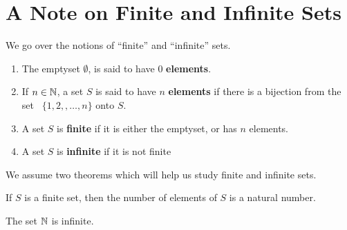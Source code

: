 
\section{A Note on Finite and Infinite Sets}

We go over the notions of ``finite'' and ``infinite'' sets.

\begin{definition}
    \begin{enumerate}[label=(\arabic*)]
        \item The emptyset $\emptyset$, is said to have $0$ \textbf{elements}.

        \item If $n \in \mathbb{N}$, a set  $S$ is said to have $n$ \textbf{elements} if there is a bijection from the set \
            $\{1,2,,\dots, n\}$ onto  $S$.

        \item A set  $S$ is \textbf{finite} if it is either the emptyset, or has $n$ elements.

        \item A set $S$ is \textbf{infinite} if it is not finite
    \end{enumerate}		
\end{definition}

We assume two theorems which will help us study finite and infinite sets.

\begin{theorem}
    If $S$ is a finite set, then the number of elements of $S$ is a natural number.
\end{theorem}

\begin{theorem}
    The set $\mathbb{N}$ is infinite.
\end{theorem}

